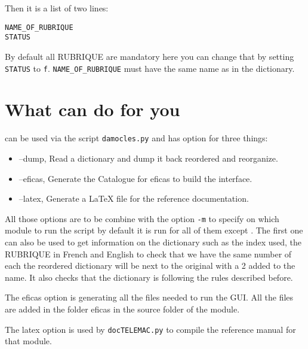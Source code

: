 Then it is a list of two lines:
\begin{verbatim}
NAME_OF_RUBRIQUE
STATUS
\end{verbatim}

By default all RUBRIQUE are mandatory here you can change that by setting
\verb!STATUS! to \verb!f!. \verb!NAME_OF_RUBRIQUE! must have the same name as
in the dictionary.

\section{What \damocles can do for you}

\damocles can be used via the script \verb!damocles.py! and has option for
three things:
\begin{itemize}
\item --dump, Read a dictionary and dump it back reordered and reorganize.
\item --eficas, Generate the Catalogue for eficas to build the interface.
\item --latex, Generate a LaTeX file for the reference documentation.
\end{itemize}
All those options are to be combine with the option \verb!-m! to specify on
which module to run the script by default it is run for all of them except
\mascaret.
The first one can also be used to get information on the dictionary such as the
index used, the RUBRIQUE in French and English to check that we have the same
number of each the reordered dictionary will be next to the original with a 2
added to the name. It also checks that the dictionary is following the rules
described before.

The eficas option is generating all the files needed to run the GUI. All the
files are added in the folder eficas in the source folder of the module.

The latex option is used by \verb!docTELEMAC.py! to compile the reference
manual for that module.
